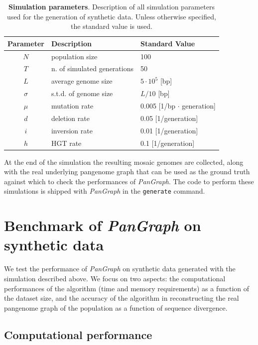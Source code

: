 \documentclass[aps,rmp,reprint,superscriptaddress,notitlepage,10pt,onecolumn]{revtex4-1}
\begin{document}
\begin{table}[hb]
    \begin{tabular}{c l l}
    \hline\hline
    Parameter & Description & Standard Value \\
    \hline
    $N$ & population size & 100 \\
    $T$ & n. of simulated generations & 50 \\
    $L$ & average genome size & $5 \cdot 10^5$ [bp] \\
    $\sigma$ & s.t.d. of genome size & $L/10$ [bp]  \\
    $\mu$ & mutation rate & 0.005 [1/bp $\cdot$ generation] \\
    $d$ & deletion rate & 0.05 [1/generation] \\
    $i$ & inversion rate & 0.01 [1/generation] \\
    $h$ & HGT rate & 0.1 [1/generation] \\
    \hline
    \end{tabular}
    \caption{{\bf Simulation parameters}. Description of all simulation parameters used for the generation of synthetic data. Unless otherwise specified, the standard value is used.}
    \label{table:sim-params}
\end{table}

At the end of the simulation the resulting mosaic genomes are collected, along with the real underlying pangenome graph that can be used as the ground truth against which to check the performances of \textit{PanGraph}. The code to perform these simulations is shipped with \textit{PanGraph} in the \verb|generate| command.

\section{Benchmark of \textit{PanGraph} on synthetic data}

We test the performance of \textit{PanGraph} on synthetic data generated with the simulation described above. We focus on two aspects: the computational performances of the algorithm (time and memory requirements) as a function of the dataset size, and the accuracy of the algorithm in reconstructing the real pangenome graph of the population as a function of sequence divergence.

\subsection{Computational performance}
\end{document}
